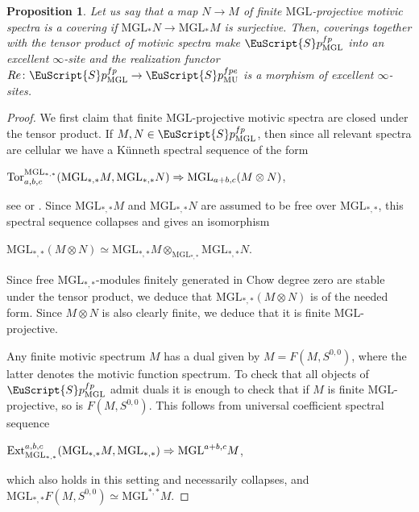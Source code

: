 \documentclass[oneside,a4paper]{amsart}
\newcommand{\euscr}[1]{\EuScript{#1}} %
\newcommand{\MU}{\mathrm{MU}} %
\newcommand{\MGL}{\mathrm{MGL}} %
\newcommand{\spectra}{\euscr{S}p} %
\theoremstyle{plain}
\newtheorem{prop}[thm]{Proposition}
\theoremstyle{definition}
\theoremstyle{remark}
\begin{document}
\begin{prop}
Let us say that a map $N \rightarrow M$ of finite $\MGL$-projective motivic spectra is a \emph{covering} if $\MGL_{*}N \rightarrow \MGL_{*}M$ is surjective. Then, coverings together with the tensor product of motivic spectra make $\spectra_{\MGL}^{fp}$ into an excellent $\infty$-site and the realization functor $Re \colon \spectra_{\MGL}^{fp} \rightarrow \spectra_{\MU}^{fpe}$ is a morphism of excellent $\infty$-sites. 
\end{prop}

\begin{proof}
We first claim that finite $\MGL$-projective motivic spectra are closed under the tensor product. If $M, N \in \spectra_{\MGL}^{fp}$, then since all relevant spectra are cellular we have a K\"{u}nneth spectral sequence of the form 

\begin{center}
$\textnormal{Tor}^{\MGL_{*,*}}_{a, b, c}(\MGL_{*, *}M, \MGL_{*, *}N) \Rightarrow \MGL_{a+b,c} (M \otimes N)$,
\end{center}
see \cite[8.6]{dugger2005motivic} or \cite[8.1.1]{joachimi2015thick}. Since $\MGL_{*, *}M$ and $\MGL_{*, *}N$ are assumed to be free over $\MGL_{*, *}$, this spectral sequence collapses and gives an isomorphism 

\begin{center}
$\MGL_{*, *} (M \otimes N) \simeq \MGL_{*, *} M \otimes _{\MGL_{*, *}} \MGL_{*, *} N$.
\end{center}
Since free $\MGL_{*, *}$-modules finitely generated in Chow degree zero are stable under the tensor product, we deduce that $\MGL_{*, *} (M \otimes N)$ is of the needed form. Since $M \otimes N$ is also clearly finite, we deduce that it is finite $\MGL$-projective. 

Any finite motivic spectrum $M$ has a dual given by $M = F(M, S^{0, 0})$, where the latter denotes the motivic function spectrum. To check that all objects of $\spectra_{\MGL}^{fp}$ admit duals it is enough to check that if $M$ is finite $\MGL$-projective, so is $F(M, S^{0, 0})$. This follows from universal coefficient spectral sequence

\begin{center}
$\textnormal{Ext}^{a, b, c} _{\MGL_{*, *}} (\MGL_{*, *} M, \MGL_{*, *}) \Rightarrow \MGL^{a+b, c} M$, 
\end{center}
which also holds in this setting and necessarily collapses, and $\MGL_{*, *} F(M, S^{0, 0}) \simeq \MGL^{*, *} M$. 


\end{proof}
\end{document}
